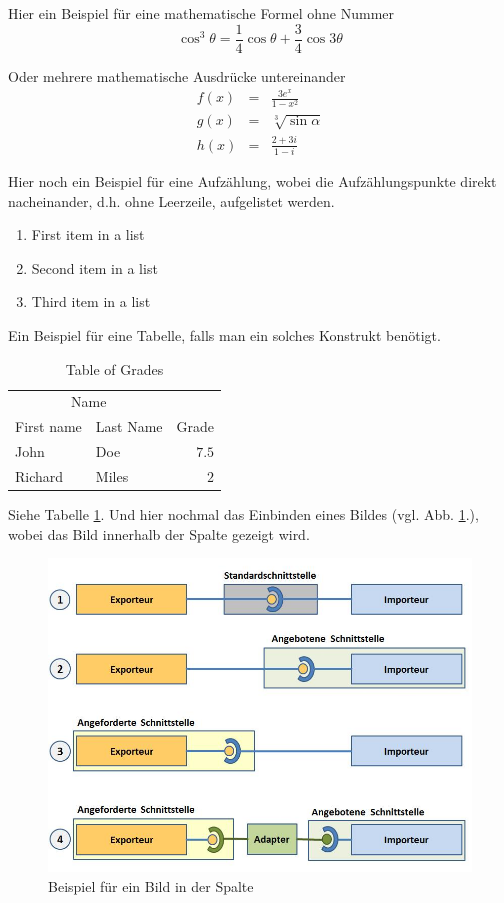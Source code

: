\documentclass[fleqn,10pt,ngerman]{SelfArx}
\begin{document}
Hier ein Beispiel für eine mathematische Formel ohne Nummer
\begin{equation*}
	\cos^3 \theta =\frac{1}{4}\cos\theta+\frac{3}{4}\cos 3\theta
	\label{eq:refname2}
\end{equation*}

Oder mehrere mathematische Ausdrücke untereinander
\begin{eqnarray}
	f(x) &=& \frac{3 e^x}{1 - x^2} \\
	g(x) &=& \sqrt[3]{\sin \alpha} \\
	h(x) &=& \frac{2 + 3i}{1- i}
\end{eqnarray}

Hier noch ein Beispiel für eine Aufzählung, wobei die Aufzählungspunkte direkt nacheinander, d.h. ohne Leerzeile, aufgelistet werden.
\begin{enumerate}[noitemsep] %
	\item First item in a list
	\item Second item in a list
	\item Third item in a list
\end{enumerate}

Ein Beispiel für eine Tabelle, falls man ein solches Konstrukt benötigt.

\begin{table}[hbt]
	\caption{Table of Grades}
	\centering
	\begin{tabular}{llr}
		\toprule
		\multicolumn{2}{c}{Name} \\
		\cmidrule(r){1-2}
		First name & Last Name & Grade \\
		\midrule
		John & Doe & $7.5$ \\
		Richard & Miles & $2$ \\
		\bottomrule
	\end{tabular}
	\label{tab:label}
\end{table}

Siehe Tabelle \ref{tab:label}.
Und hier nochmal das Einbinden eines Bildes (vgl. Abb. \ref{fig:Schnittstellen}.), wobei das Bild innerhalb der Spalte gezeigt wird.


\begin{figure}[ht]\centering
	\includegraphics[width=5 cm]{Abbildungen/Schnittstellen}
	\caption{Beispiel für ein Bild in der Spalte}
	\label{fig:Schnittstellen}
\end{figure}
\end{document}
